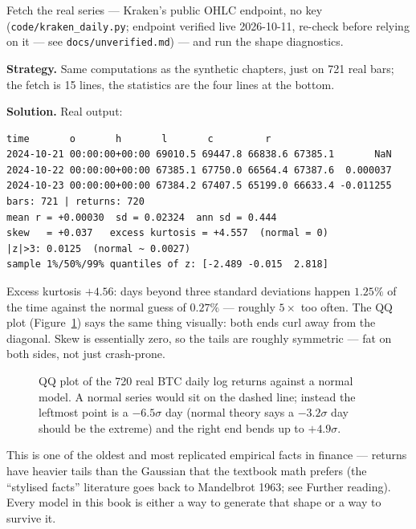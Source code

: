 \begin{example}\label{ex:btc}
Fetch the real series --- Kraken's public OHLC endpoint, no key
(\texttt{code/kraken\_daily.py}; endpoint verified live
2026-10-11, re-check before relying on it --- see
\texttt{docs/unverified.md}) --- and run the shape diagnostics.

\textbf{Strategy.} Same computations as the synthetic chapters, just
on 721 real bars; the fetch is 15 lines, the statistics are the four
lines at the bottom.

\textbf{Solution.} Real output:
\begin{lstlisting}[numbers=none]
                     time       o       h       l       c         r
2024-10-21 00:00:00+00:00 69010.5 69447.8 66838.6 67385.1       NaN
2024-10-22 00:00:00+00:00 67385.1 67750.0 66564.4 67387.6  0.000037
2024-10-23 00:00:00+00:00 67384.2 67407.5 65199.0 66633.4 -0.011255
bars: 721 | returns: 720
mean r = +0.00030  sd = 0.02324  ann sd = 0.444
skew   = +0.037   excess kurtosis = +4.557  (normal = 0)
|z|>3: 0.0125  (normal ~ 0.0027)
sample 1%/50%/99% quantiles of z: [-2.489 -0.015  2.818]
\end{lstlisting}
Excess kurtosis $+4.56$: days beyond three standard deviations happen
$1.25\%$ of the time against the normal guess of $0.27\%$ --- roughly
$5\times$ too often. The QQ plot (Figure~\ref{fig:qq}) says the same
thing visually: both ends curl away from the diagonal. Skew is
essentially zero, so the tails are roughly symmetric --- fat on both
sides, not just crash-prone.
\end{example}

\begin{figure}[ht]\centering

\caption{QQ plot of the 720 real BTC daily log returns against a
normal model. A normal series would sit on the dashed line; instead
the leftmost point is a $-6.5\sigma$ day (normal theory says a
$-3.2\sigma$ day should be the extreme) and the right end bends up to
$+4.9\sigma$.}
\label{fig:qq}
\end{figure}

\begin{remark}\label{rem:stylized}
This is one of the oldest and most replicated empirical facts in
finance --- returns have heavier tails than the Gaussian that the
textbook math prefers (the ``stylised facts'' literature goes back to
Mandelbrot 1963; see Further reading). Every model in this book is
either a way to generate that shape or a way to survive it.
\end{remark}

